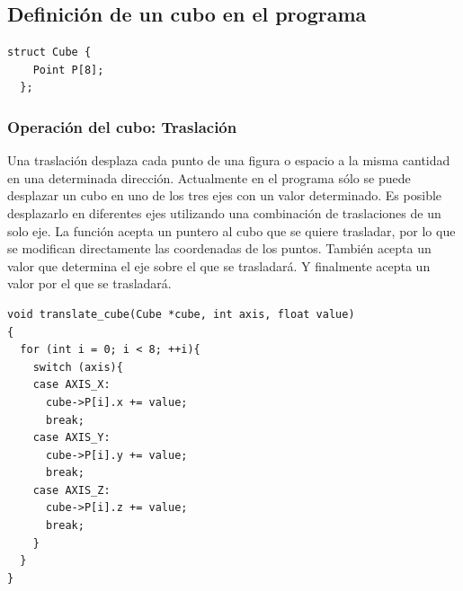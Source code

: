 \documentclass{article}
\begin{document}
\subsection{Definición de un cubo en el programa}
\begin{lstlisting}[frame=single]
  struct Cube {
    Point P[8];
  };
\end{lstlisting}
\subsubsection{Operación del cubo: Traslación}
Una traslación desplaza cada punto de una figura o espacio a la misma cantidad en una determinada dirección. Actualmente en el programa sólo se puede desplazar un cubo en uno de los tres ejes con un valor determinado. Es posible desplazarlo en diferentes ejes utilizando una combinación de traslaciones de un solo eje. \newline
La función acepta un puntero al cubo que se quiere trasladar, por lo que se modifican directamente las coordenadas de los puntos. También acepta un valor que determina el eje sobre el que se trasladará. Y finalmente acepta un valor por el que se trasladará.
\begin{lstlisting}[frame=single]
void translate_cube(Cube *cube, int axis, float value)
{
  for (int i = 0; i < 8; ++i){
    switch (axis){
    case AXIS_X:
      cube->P[i].x += value;
      break;
    case AXIS_Y:
      cube->P[i].y += value;
      break;
    case AXIS_Z:
      cube->P[i].z += value;
      break;
    }
  }
}
\end{lstlisting}
\end{document}
